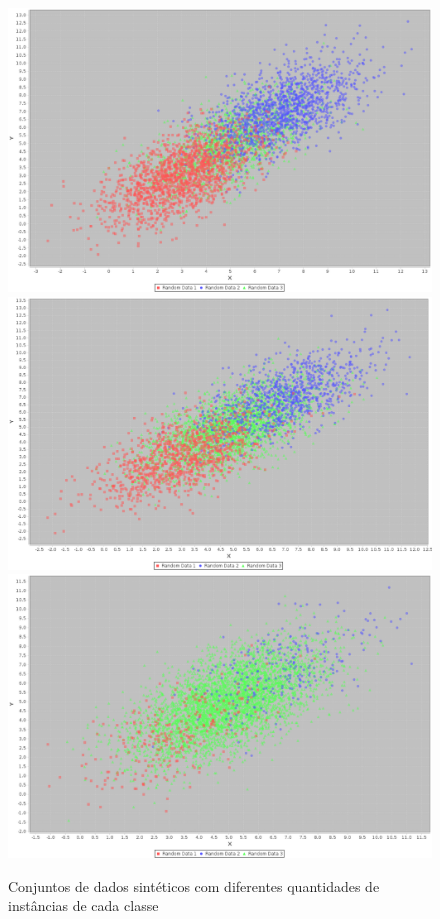 {\begin{figure}
  \centering
  \includegraphics[width=120mm,scale=0.7]{images/dist1500-1500-5.eps}
  \includegraphics[width=120mm,scale=0.7]{images/dist1000-2500-5.eps}
  \includegraphics[width=120mm,scale=0.7]{images/dist250-4000-5.eps}
  \caption{Conjuntos de dados sintéticos com diferentes quantidades de instâncias de cada classe}
  \label{fig:dist_diferentes}
\end{figure}

}
